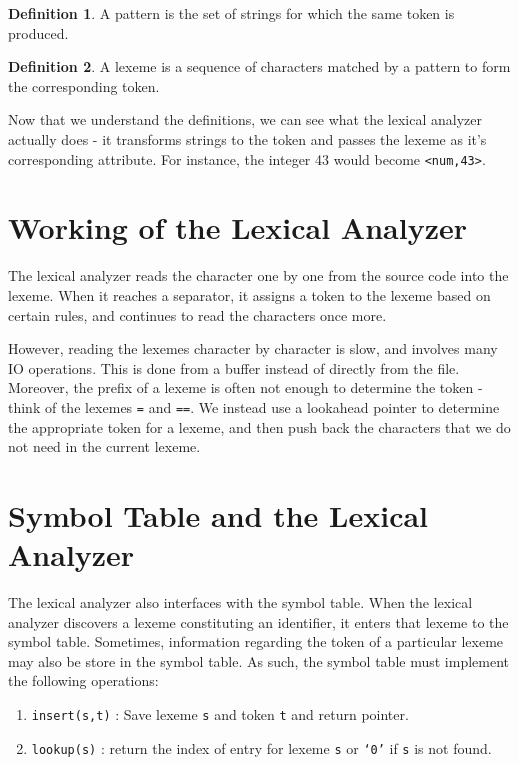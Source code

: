 \documentclass[12pt,letterpaper]{amsbook}
\theoremstyle{definition}
\newtheorem{definition}{Definition}[section] %
\begin{document}
\begin{definition}
  A pattern is the set of strings for which the same token is produced.
\end{definition}

\begin{definition}
  A lexeme is a sequence of characters matched by a pattern to form the corresponding token.
\end{definition}

Now that we understand the definitions, we can see what the lexical analyzer actually does - it transforms strings to the token and passes the lexeme as it's corresponding attribute. For instance, the integer 43 would become \texttt{<num,43>}.

\section{Working of the Lexical Analyzer}

The lexical analyzer reads the character one by one from the source code into the lexeme. When it reaches a separator, it assigns a token to the lexeme based on certain rules, and continues to read the characters once more.

However, reading the lexemes character by character is slow, and involves many IO operations. This is done from a buffer instead of directly from the file. Moreover, the prefix of a lexeme is often not enough to determine the token - think of the lexemes \texttt{=} and \texttt{==}. We instead use a lookahead pointer to determine the appropriate token for a lexeme, and then push back the characters that we do not need in the current lexeme.

\section{Symbol Table and the Lexical Analyzer}

The lexical analyzer also interfaces with the symbol table. When the lexical analyzer discovers a lexeme constituting an identifier, it enters that lexeme to the symbol table. Sometimes, information regarding the token of a particular lexeme may also be store in the symbol table. As such, the symbol table must implement the following operations:

\begin{enumerate}
  \item \texttt{insert(s,t)} : Save lexeme \texttt{s} and token \texttt{t} and return pointer.
  \item \texttt{lookup(s)} : return the index of entry for lexeme \texttt{s} or \texttt{`0'} if \texttt{s} is not found.
\end{enumerate}
\end{document}
